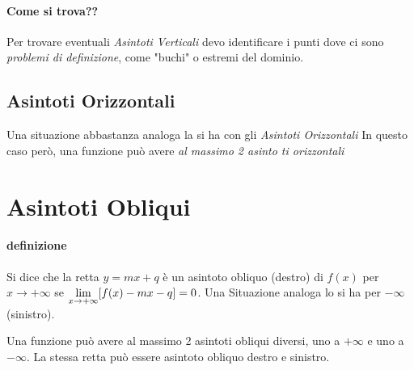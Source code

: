 \documentclass[12pt, a4paper, openany]{book}
\begin{document}
\paragraph*{Come si trova??} Per trovare eventuali \emph{Asintoti Verticali} devo identificare i punti dove ci sono \emph{problemi di definizione},
come "buchi" o estremi del dominio.

\subsection*{Asintoti Orizzontali}
Una situazione abbastanza analoga la si ha con gli \emph{Asintoti Orizzontali}
In questo caso però, una funzione può avere \emph{al massimo 2 asinto   ti orizzontali}

\section{Asintoti Obliqui}
\paragraph*{definizione}{ %
	Si dice che la retta $y=mx + q$ è un asintoto obliquo (destro) di $f(x)$ per $x \to +\infty$ se
	$\underset{x \to +\infty}{\lim} [f(x)-mx-q]=0$.
	Una Situazione analoga lo si ha per $-\infty $ (sinistro).
}

Una funzione può avere al massimo 2 asintoti obliqui diversi, uno a $+\infty$ e uno a $-\infty$.
La stessa retta può essere asintoto obliquo destro e sinistro.
\end{document}
